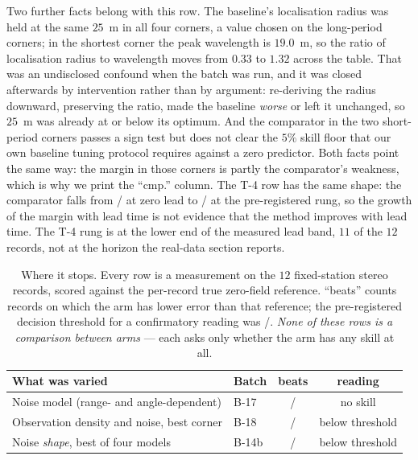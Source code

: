 \documentclass[review]{elsarticle}
\begin{document}
Two further facts belong with this row. The baseline's localisation radius was held
at the same $25$~m in all four corners, a value chosen on the long-period corners;
in the shortest corner the peak wavelength is $19.0$~m, so the ratio of localisation
radius to wavelength moves from $0.33$ to $1.32$ across the table. That was an
undisclosed confound when the batch was run, and it was closed afterwards by
intervention rather than by argument: re-deriving the radius downward, preserving
the ratio, made the baseline \emph{worse} or left it unchanged, so $25$~m was
already at or below its optimum. And the comparator in the two short-period corners
passes a sign test but does not clear the $5\%$ skill floor that our own baseline
tuning protocol requires against a zero predictor. Both facts point the same way:
the margin in those corners is partly the comparator's weakness, which is why we
print the ``cmp.'' column. The T-4 row has the same shape: the comparator falls
from \TFourCmpAtZero{}/\TFourN{} at zero lead to \TFourCmp{}/\TFourN{} at the
pre-registered rung, so the growth of the margin with lead time is not evidence
that the method improves with lead time. The T-4 rung is at the lower end of the
measured lead band, $11$ of the $12$ records, not at the horizon the real-data
section reports. 

\begin{table}[!htbp]
\centering
\caption{Where it stops. Every row is a measurement on the $12$ fixed-station
stereo records, scored against the per-record true zero-field reference. ``beats''
counts records on which the arm has lower error than that reference; the
pre-registered decision threshold for a confirmatory reading was
\BEighteenConfirm{}/\BEighteenN{}. \emph{None of these rows is a comparison
between arms} --- each asks only whether the arm has any skill at all.}
\label{tab:boundary}
\small
\begin{tabular}{llcc}
\toprule
What was varied & Batch & beats & reading \\
\midrule
Noise model (range- and angle-dependent) & B-17 & \BSeventeenBeats{}/\BSeventeenN{} & no skill \\
Observation density and noise, best corner & B-18 & \BEighteenBeats{}/\BEighteenN{} & below threshold \\
Noise \emph{shape}, best of four models & B-14b & \BFourteenBBeats{}/\BFourteenBN{} & below threshold \\
\bottomrule
\end{tabular}
\end{table}
\end{document}
